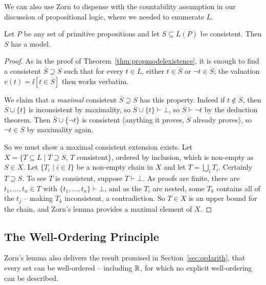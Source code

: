 \documentclass[a4paper]{scrartcl}
\begin{document}
We can also use Zorn to dispense with the countability assumption in our discussion of propositional logic, where we needed to enumerate $L$.

\begin{theorem}\label{thm:propmodelexistenceuncountable}
  Let $P$ be any set of primitive propositions and let $S \subseteq L(P)$ be consistent. Then $S$ has a model.
\end{theorem}
\begin{proof}
  As in the proof of Theorem~\ref{thm:propmodelexistence}, it is enough to find a consistent $\overline S \supseteq S$ such that for every $t \in L$, either $t \in \overline S$ or $\lnot t \in \overline S$; the valuation $v(t) = \ii[t \in \overline S]$ then works verbatim.

  We claim that a \emph{maximal} consistent $\overline S \supseteq S$ has this property. Indeed if $t \notin \overline S$, then $\overline S \cup \{t\}$ is inconsistent by maximality, so $\overline S \cup \{t\} \vdash \bot$, so $\overline S \vdash \lnot t$ by the deduction theorem. Then $\overline S \cup \{\lnot t\}$ is consistent (anything it proves, $\overline S$ already proves), so $\lnot t \in \overline S$ by maximality again.

  So we must show a maximal consistent extension exists. Let $X = \{T \subseteq L \mid T \supseteq S, \, T \text{ consistent}\}$, ordered by inclusion, which is non-empty as $S \in X$. Let $\{T_i \mid i \in I\}$ be a non-empty chain in $X$ and let $T = \bigcup_i T_i$. Certainly $T \supseteq S$. To see $T$ is consistent, suppose $T \vdash \bot$. As proofs are finite, there are $t_1, \dots, t_n \in T$ with $\{t_1, \dots, t_n\} \vdash \bot$, and as the $T_i$ are nested, some $T_k$ contains all of the $t_j$ -- making $T_k$ inconsistent, a contradiction. So $T \in X$ is an upper bound for the chain, and Zorn's lemma provides a maximal element of $X$.
\end{proof}

\subsection{The Well-Ordering Principle}

Zorn's lemma also delivers the result promised in Section~\ref{sec:ordarith}, that every set can be well-ordered -- including $\mathbb{R}$, for which no explicit well-ordering can be described.
\end{document}
